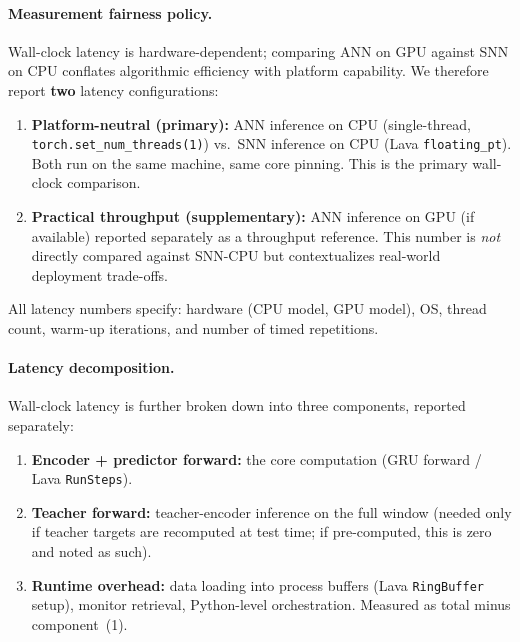 \documentclass[11pt,a4paper]{article}
\begin{document}
\paragraph{Measurement fairness policy.}\label{sec:fairness}
Wall-clock latency is hardware-dependent; comparing ANN on GPU against
SNN on CPU conflates algorithmic efficiency with platform capability.
We therefore report \textbf{two} latency configurations:

\begin{enumerate}[label=(\alph*),nosep]
\item \textbf{Platform-neutral (primary):} ANN inference on CPU
  (single-thread, \texttt{torch.set\_num\_threads(1)}) vs.\ SNN
  inference on CPU (Lava \texttt{floating\_pt}).  Both run on the same
  machine, same core pinning.  This is the primary wall-clock
  comparison.
\item \textbf{Practical throughput (supplementary):} ANN inference on
  GPU (if available) reported separately as a throughput reference.
  This number is \emph{not} directly compared against SNN-CPU but
  contextualizes real-world deployment trade-offs.
\end{enumerate}

\noindent All latency numbers specify: hardware (CPU model, GPU model),
OS, thread count, warm-up iterations, and number of timed repetitions.

\paragraph{Latency decomposition.}
Wall-clock latency is further broken down into three components,
reported separately:
\begin{enumerate}[nosep,label=(\arabic*)]
\item \textbf{Encoder + predictor forward:} the core computation
  (GRU forward / Lava \texttt{RunSteps}).
\item \textbf{Teacher forward:} teacher-encoder inference on the full
  window (needed only if teacher targets are recomputed at test time;
  if pre-computed, this is zero and noted as such).
\item \textbf{Runtime overhead:} data loading into process buffers
  (Lava \texttt{RingBuffer} setup), monitor retrieval, Python-level
  orchestration.  Measured as total minus component~(1).
\end{enumerate}
\end{document}
